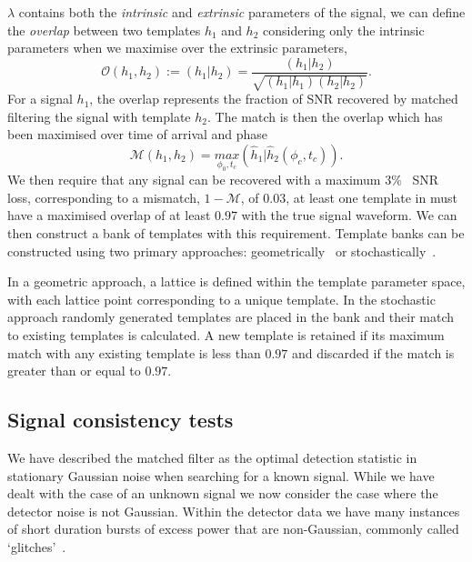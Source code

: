 $\lambda$ contains both the \textit{intrinsic} and \textit{extrinsic} parameters of the signal, we can define the \textit{overlap} between two templates $h_{1}$ and $h_{2}$ considering only the intrinsic parameters when we maximise over the extrinsic parameters,
%
\begin{equation}
    \mathcal{O}(h_{1}, h_{2}) := (h_{1} | h_{2}) = \frac{(h_{1} | h_{2})}{\sqrt{(h_{1} | h_{1})(h_{2} | h_{2})}}.
\end{equation}
%
For a signal $h_{1}$, the overlap represents the fraction of SNR recovered by matched filtering the signal with template $h_{2}$. The match is then the overlap which has been maximised over time of arrival and phase~\cite{Harry_Lundgren:2012}
%
\begin{equation}
    \mathcal{M}(h_{1}, h_{2}) = \underset{\phi_0, t_{c}}{max}(\hat{h}_{1}|\hat{h}_{2}(\phi_{c}, t_{c})).
\end{equation}
%
We then require that any signal can be recovered with a maximum $3\%$~\cite{Owen_Sathya:1999} SNR loss, corresponding to a mismatch, $1 - \mathcal{M}$, of $0.03$, at least one template in must have a maximised overlap of at least $0.97$ with the true signal waveform. We can then construct a bank of templates with this requirement. Template banks can be constructed using two primary approaches: geometrically~\cite{geom_bank_1:1991, geom_bank_2:1992, geom_bank_3:1995, geom_bank_4:1995, Owen_Sathya:1999} or stochastically~\cite{Harry_sbank:2009, Stochastic_tb:2008}.

In a geometric approach, a lattice is defined within the template parameter space, with each lattice point corresponding to a unique template. In the stochastic approach randomly generated templates are placed in the bank and their match to existing templates is calculated. A new template is retained if its maximum match with any existing template is less than $0.97$ and discarded if the match is greater than or equal to $0.97$.

\subsection{\label{2:sec:signal-consistency}Signal consistency tests}

We have described the matched filter as the optimal detection statistic in stationary Gaussian noise when searching for a known signal. While we have dealt with the case of an unknown signal we now consider the case where the detector noise is not Gaussian. Within the detector data we have many instances of short duration bursts of excess power that are non-Gaussian, commonly called `glitches'~\cite{LIGO_data_quality:2015}.

